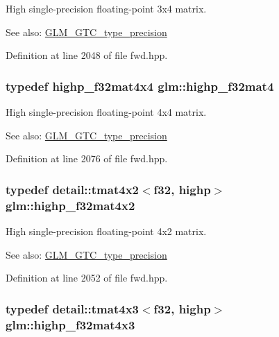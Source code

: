 High single-precision floating-point 3x4 matrix. \begin{Desc}
\item[See also:]\hyperlink{group__gtc__type__precision}{GLM\_\-GTC\_\-type\_\-precision} \end{Desc}


Definition at line 2048 of file fwd.hpp.\hypertarget{group__gtc__type__precision_gc14c1bfb647e39d459c7489ede2156cc}{
\subsubsection[highp\_\-f32mat4]{\setlength{\rightskip}{0pt plus 5cm}typedef highp\_\-f32mat4x4 {\bf glm::highp\_\-f32mat4}}}
\label{group__gtc__type__precision_gc14c1bfb647e39d459c7489ede2156cc}


High single-precision floating-point 4x4 matrix. \begin{Desc}
\item[See also:]\hyperlink{group__gtc__type__precision}{GLM\_\-GTC\_\-type\_\-precision} \end{Desc}


Definition at line 2076 of file fwd.hpp.\hypertarget{group__gtc__type__precision_g4d799497b303c2434fe709f81f6bd4dd}{
\subsubsection[highp\_\-f32mat4x2]{\setlength{\rightskip}{0pt plus 5cm}typedef detail::tmat4x2$<$f32, highp$>$ {\bf glm::highp\_\-f32mat4x2}}}
\label{group__gtc__type__precision_g4d799497b303c2434fe709f81f6bd4dd}


High single-precision floating-point 4x2 matrix. \begin{Desc}
\item[See also:]\hyperlink{group__gtc__type__precision}{GLM\_\-GTC\_\-type\_\-precision} \end{Desc}


Definition at line 2052 of file fwd.hpp.\hypertarget{group__gtc__type__precision_g5bd692575886422f501a379386e391d9}{
\subsubsection[highp\_\-f32mat4x3]{\setlength{\rightskip}{0pt plus 5cm}typedef detail::tmat4x3$<$f32, highp$>$ {\bf glm::highp\_\-f32mat4x3}}}
\label{group__gtc__type__precision_g5bd692575886422f501a379386e391d9}


